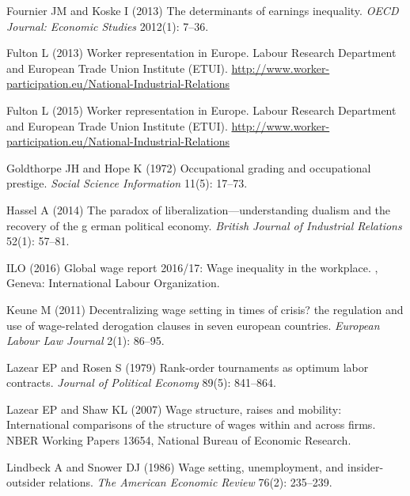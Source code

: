 \documentclass[Review,times,sageh,11pt]{sagej}
\begin{document}
\begin{thebibliography}{38}
Fournier JM and Koske I (2013) The determinants of earnings inequality.
\newblock \emph{OECD Journal: Economic Studies} 2012(1): 7--36.

Fulton L (2013) Worker representation in Europe.
\newblock Labour Research Department and European Trade Union Institute (ETUI).
\newblock \urlprefix\url{http://www.worker-participation.eu/National-Industrial-Relations}

Fulton L (2015) Worker representation in Europe.
\newblock Labour Research Department and European Trade Union Institute (ETUI).
\newblock \urlprefix\url{http://www.worker-participation.eu/National-Industrial-Relations}

Goldthorpe JH and Hope K (1972) Occupational grading and occupational prestige.
\newblock \emph{Social Science Information} 11(5): 17--73.

Hassel A (2014) The paradox of liberalization—understanding dualism and the
  recovery of the g erman political economy.
\newblock \emph{British Journal of Industrial Relations} 52(1): 57--81.

{ILO} (2016) Global wage report 2016/17: Wage inequality in the workplace.
, Geneva: International
  Labour Organization.

Keune M (2011) Decentralizing wage setting in times of crisis? the regulation
  and use of wage-related derogation clauses in seven european countries.
\newblock \emph{European Labour Law Journal} 2(1): 86--95.

Lazear EP and Rosen S (1979) Rank-order tournaments as optimum labor contracts.
\newblock \emph{Journal of Political Economy} 89(5): 841--864.

Lazear EP and Shaw KL (2007) Wage structure, raises and mobility: International
  comparisons of the structure of wages within and across firms.
\newblock NBER Working Papers 13654, National Bureau of Economic Research.

Lindbeck A and Snower DJ (1986) Wage setting, unemployment, and
  insider-outsider relations.
\newblock \emph{The American Economic Review} 76(2): 235--239.


\end{thebibliography}
\end{document}
